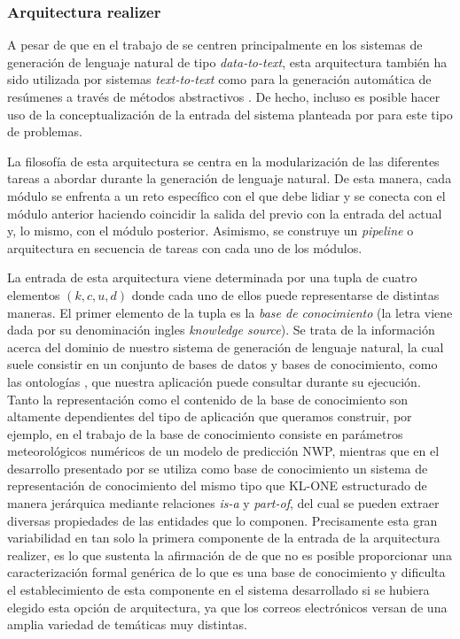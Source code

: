\subsubsection{Arquitectura realizer}\label{sss:realizer}
A pesar de que en el trabajo de \cite{biblia} se centren principalmente en los sistemas de generación de lenguaje natural de tipo \textit{data-to-text}, esta arquitectura también ha sido utilizada por sistemas \textit{text-to-text} como para la generación automática de resúmenes a través de métodos abstractivos \citep{genest2011framework}. De hecho, incluso es posible hacer uso de la conceptualización de la entrada del sistema planteada por \cite{biblia} para este tipo de problemas.

La filosofía de esta arquitectura se centra en la modularización de las diferentes tareas a abordar durante la generación de lenguaje natural. De esta manera, cada módulo se enfrenta a un reto específico con el que debe lidiar y se conecta con el módulo anterior haciendo coincidir la salida del previo con la entrada del actual y, lo mismo, con el módulo posterior. Asimismo, se construye un \textit{pipeline} o arquitectura en secuencia de tareas con cada uno de los módulos.

La entrada de esta arquitectura viene determinada por una tupla de cuatro elementos $(k, c, u, d)$ donde cada uno de ellos puede representarse de distintas maneras. El primer elemento de la tupla es la \textit{base de conocimiento} (la letra viene dada por su denominación ingles \textit{knowledge source}). Se trata de la información acerca del dominio de nuestro sistema de generación de lenguaje natural, la cual suele consistir en un conjunto de bases de datos y bases de conocimiento, como las ontologías \citep{fensel2001ontologies}, que nuestra aplicación puede consultar durante su ejecución. Tanto la representación como el contenido de la base de conocimiento son altamente dependientes del tipo de aplicación que queramos construir, por ejemplo, en el trabajo de \cite{reiter2005choosing} la base de conocimiento consiste en parámetros meteorológicos numéricos de un modelo de predicción NWP, mientras que en el desarrollo presentado por \cite{reiter1995automatic} se utiliza como base de conocimiento un sistema de representación de conocimiento del mismo tipo que KL-ONE \citep{brachman1989overview} estructurado de manera jerárquica mediante relaciones \textit{is-a} y \textit{part-of}, del cual se pueden extraer diversas propiedades de las entidades que lo componen. Precisamente esta gran variabilidad en tan solo la primera componente de la entrada de la arquitectura realizer, es lo que sustenta la afirmación de \cite{biblia} de que no es posible proporcionar una caracterización formal genérica de lo que es una base de conocimiento y dificulta el establecimiento de esta componente en el sistema desarrollado si se hubiera elegido esta opción de arquitectura, ya que los correos electrónicos versan de una amplia variedad de temáticas muy distintas.

